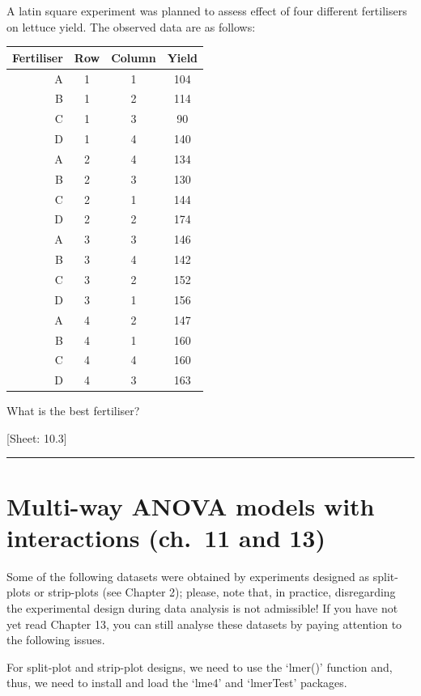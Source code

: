 \documentclass[a4paper,12pt,oneside]{book}
\begin{document}
A latin square experiment was planned to assess effect of four different fertilisers on lettuce yield. The observed data are as follows:

\begin{longtable}[]{@{}rccc@{}}
\toprule\noalign{}
Fertiliser & Row & Column & Yield \\
\midrule\noalign{}
\endhead
\bottomrule\noalign{}
\endlastfoot
A & 1 & 1 & 104 \\
B & 1 & 2 & 114 \\
C & 1 & 3 & 90 \\
D & 1 & 4 & 140 \\
A & 2 & 4 & 134 \\
B & 2 & 3 & 130 \\
C & 2 & 1 & 144 \\
D & 2 & 2 & 174 \\
A & 3 & 3 & 146 \\
B & 3 & 4 & 142 \\
C & 3 & 2 & 152 \\
D & 3 & 1 & 156 \\
A & 4 & 2 & 147 \\
B & 4 & 1 & 160 \\
C & 4 & 4 & 160 \\
D & 4 & 3 & 163 \\
\end{longtable}

What is the best fertiliser?

{[}Sheet: 10.3{]}

\begin{center}\rule{0.5\linewidth}{0.5pt}\end{center}

\hypertarget{multi-way-anova-models-with-interactions-ch.-11-and-13}{%
\section{Multi-way ANOVA models with interactions (ch.~11 and 13)}\label{multi-way-anova-models-with-interactions-ch.-11-and-13}}

Some of the following datasets were obtained by experiments designed as split-plots or strip-plots (see Chapter 2); please, note that, in practice, disregarding the experimental design during data analysis is not admissible! If you have not yet read Chapter 13, you can still analyse these datasets by paying attention to the following issues.

For split-plot and strip-plot designs, we need to use the `lmer()' function and, thus, we need to install and load the `lme4' and `lmerTest' packages.
\end{document}
